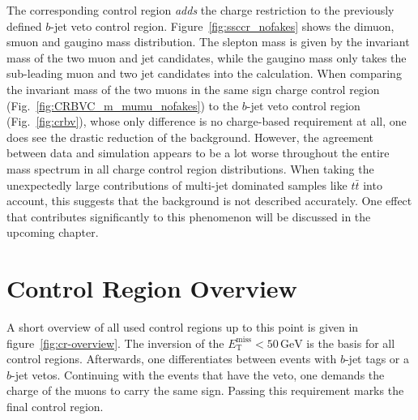 The corresponding control region \textit{adds} the charge restriction to the previously defined $b$-jet veto control region. Figure~\ref{fig:ssccr_nofakes} shows the dimuon, smuon and gaugino mass distribution. The slepton mass is given by the invariant mass of the two muon and jet candidates, while the gaugino mass only takes the sub-leading muon and two jet candidates into the calculation. When comparing the invariant mass of the two muons in the same sign charge control region (Fig.~\ref{fig:CRBVC_m_mumu_nofakes}) to the $b$-jet veto control region (Fig.~\ref{fig:crbv}), whose only difference is no charge-based requirement at all, one does see the drastic reduction of the background. However, the agreement between data and simulation appears to be a lot worse throughout the entire mass spectrum in all charge control region distributions. When taking the unexpectedly large contributions of multi-jet dominated samples like $t\bar{t}$ into account, this suggests that the background is not described accurately. One effect that contributes significantly to this phenomenon will be discussed in the upcoming chapter.

\section{Control Region Overview}
\label{sec:cr-overview}

A short overview of all used control regions up to this point is given in figure~\ref{fig:cr-overview}. The inversion of the $E^{\text{miss}}_{\text{T}} < 50\,\text{GeV}$ is the basis for all control regions. Afterwards, one differentiates between events with $b$-jet tags or a $b$-jet vetos. Continuing with the events that have the veto, one demands the charge of the muons to carry the same sign. Passing this requirement marks the final control region.

